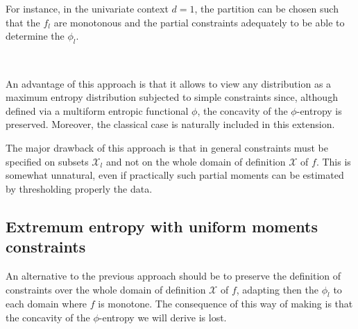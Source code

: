 \documentclass[english,sort&compress]{elsarticle}
\theoremstyle{definition}
\theoremstyle{plain}
\theoremstyle{plain}
\def\X{\mathcal{X}}
\begin{document}
For instance,  in the univariate  context $d =  1$, the partition can  be chosen
such that the $f_l$ are monotonous  and the partial constraints adequately to be
able to determine the $\phi_l$.

\

An advantage of  this approach is that  it allows to view any  distribution as a
maximum  entropy distribution  subjected to  simple constraints  since, although
defined  via  a multiform  entropic  functional  $\phi$,  the concavity  of  the
$\phi$-entropy is preserved. Moreover,  the classical case is naturally included
in this extension.

The  major drawback  of this  approach is  that in  general constraints  must be
specified on  subsets $\X_l$ and not on  the whole domain of  definition $\X$ of
$f$. This is somewhat unnatural, even if practically such partial moments can be
estimated by thresholding properly the data.



\subsection{Extremum entropy with uniform moments constraints}
\label{subsec:ExtremalPhiEnt}

An alternative to the previous approach  should be to preserve the definition of
constraints over the  whole domain of definition $\X$ of  $f$, adapting then the
$\phi_l$ to  each domain where $f$ is  monotone. The consequence of  this way of
making is that the concavity of the $\phi$-entropy we will derive is lost.
\end{document}
